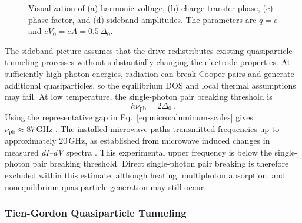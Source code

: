         \begin{figure}[t]
            \centering
            \hfill
            \hfill
            \hfill
            \caption{
                Visualization of (a) harmonic voltage, (b) charge transfer phase, (c) phase factor, and (d) sideband amplitudes. The parameters are $q=e$ and $eV_0=eA=0.5\,\Delta_0$.
            }
            \label{fig:micro:pat-drive}
        \end{figure}

        The sideband picture assumes that the drive redistributes existing quasiparticle tunneling processes without substantially changing the electrode properties. At sufficiently high photon energies, radiation can break Cooper pairs and generate additional quasiparticles, so the equilibrium DOS and local thermal assumptions may fail. At low temperature, the single-photon pair breaking threshold is
        \begin{equation}
            h\nu_\mathrm{pb} = 2\Delta_0\,.
        \end{equation}
        Using the representative gap in Eq.~\eqref{eq:micro:aluminum-scales} gives $\nu_\mathrm{pb}\approx87\,\mathrm{GHz}$ \cite{bardeen_theory_1957,tinkham_introduction_2004}. The installed microwave paths transmitted frequencies up to approximately $20\,\mathrm{GHz}$, as established from microwave induced changes in measured \textit{dI--dV} spectra \cite{raif_electronic_2024}. This experimental upper frequency is below the single-photon pair breaking threshold. Direct single-photon pair breaking is therefore excluded within this estimate, although heating, multiphoton absorption, and nonequilibrium quasiparticle generation may still occur.

        \subsubsection*{Tien-Gordon Quasiparticle Tunneling}

